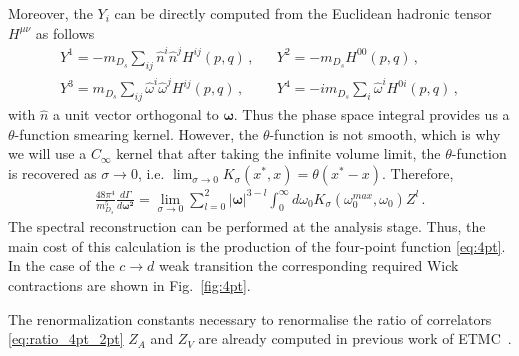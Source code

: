 Moreover, the $Y_i$ can be directly computed from the Euclidean
hadronic tensor $H^{\mu\nu}$ as follows 
\begin{align}
  &Y^1=-m_{D_s}\sum_{ij}\hat{n}^i\hat{n}^j H^{ij}(p,q)\,,&& Y^2=-m_{D_s}H^{00}(p,q)\,,\\
  &Y^3=m_{D_s}\sum_{ij}\hat{\omega}^i\hat{\omega}^j H^{ij}(p,q)\,,&&
  Y^4=-im_{D_s}\sum_{i}\hat{\omega}^i H^{0i}(p,q)\,,&
\end{align} 
with $\hat{n}$ a unit vector orthogonal to $\bm\omega$.
Thus the phase space integral provides us a $\theta$-function smearing
kernel. However, the $\theta$-function is not smooth, which is why we
will use a $C_\infty$ kernel that 
after taking the infinite volume limit, the 
$\theta$-function is recovered as $\sigma\to0$, i.e. $\lim_{\sigma\to 0} K_\sigma(x^*,x)=\theta(x^*-x)$.
 Therefore,
\begin{gather}
  \frac{48 \pi^4}{m_{D_s}^5}\frac{d\Gamma}{d \bm{ \omega^2} }
  =\lim_{\sigma\to 0}\sum_{l=0}^2 |\bm{\omega}|^{3-l}\int_0^{\infty}d \omega_0 K_\sigma(\omega_0^{max},\omega_0) Z^l\,.
\end{gather}
The spectral reconstruction can be performed at the analysis stage. Thus,
the main cost of this calculation is the production of the
four-point function \eqref{eq:4pt}. In the case of the $c\to d$ weak
transition the corresponding required Wick contractions are shown in
Fig.~\ref{fig:4pt}.

The renormalization constants necessary to renormalise the ratio of
correlators \eqref{eq:ratio_4pt_2pt} $Z_A$ and $Z_V$ are already
computed in previous work of ETMC~\cite{ExtendedTwistedMass:2022jpw}. 


